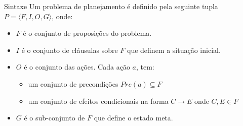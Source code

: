 \begin{frame}{Sintaxe}
    Um problema de planejamento é definido pela seguinte tupla $P=\langle F, I, O, G\rangle$, 
    onde:
    \begin{itemize}
    \item $F$ é o conjunto de proposições do problema.
    \item $I$ é o conjunto de cláusulas sobre $F$ que definem a situação inicial.
    \item $O$ é o conjunto das ações. Cada ação $a$, tem:
        \begin{itemize}
            \item um conjunto de precondições $Pre(a) \subseteq F$
            \item um conjunto de efeitos condicionais na forma $C\rightarrow E$ onde $C,E \in F$
        \end{itemize}
    \item $G$ é o sub-conjunto de $F$ que define o estado meta. 
    \end{itemize}

\end{frame}


% 



